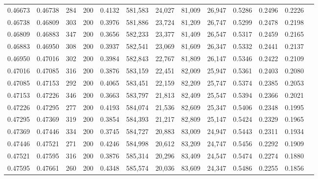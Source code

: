 \begin{tabular}{rrrrrrrrrrrrr}
0.46673 & 0.46738 &    284 & 200 &                                     0.4132 & 581,583 &  24,027 &  81,009 &  26,947 & 0.5286 & 0.2496 & 0.2226 \\
0.46738 & 0.46809 &    303 & 200 &                                     0.3976 & 581,886 &  23,724 &  81,209 &  26,747 & 0.5299 & 0.2478 & 0.2198 \\
0.46809 & 0.46883 &    347 & 200 &                                     0.3656 & 582,233 &  23,377 &  81,409 &  26,547 & 0.5317 & 0.2459 & 0.2165 \\
0.46883 & 0.46950 &    308 & 200 &                                     0.3937 & 582,541 &  23,069 &  81,609 &  26,347 & 0.5332 & 0.2441 & 0.2137 \\
0.46950 & 0.47016 &    302 & 200 &                                     0.3984 & 582,843 &  22,767 &  81,809 &  26,147 & 0.5346 & 0.2422 & 0.2109 \\
0.47016 & 0.47085 &    316 & 200 &                                     0.3876 & 583,159 &  22,451 &  82,009 &  25,947 & 0.5361 & 0.2403 & 0.2080 \\
0.47085 & 0.47153 &    292 & 200 &                                     0.4065 & 583,451 &  22,159 &  82,209 &  25,747 & 0.5374 & 0.2385 & 0.2053 \\
0.47153 & 0.47226 &    346 & 200 &                                     0.3663 & 583,797 &  21,813 &  82,409 &  25,547 & 0.5394 & 0.2366 & 0.2021 \\
0.47226 & 0.47295 &    277 & 200 &                                     0.4193 & 584,074 &  21,536 &  82,609 &  25,347 & 0.5406 & 0.2348 & 0.1995 \\
0.47295 & 0.47369 &    319 & 200 &                                     0.3854 & 584,393 &  21,217 &  82,809 &  25,147 & 0.5424 & 0.2329 & 0.1965 \\
0.47369 & 0.47446 &    334 & 200 &                                     0.3745 & 584,727 &  20,883 &  83,009 &  24,947 & 0.5443 & 0.2311 & 0.1934 \\
0.47446 & 0.47521 &    271 & 200 &                                     0.4246 & 584,998 &  20,612 &  83,209 &  24,747 & 0.5456 & 0.2292 & 0.1909 \\
0.47521 & 0.47595 &    316 & 200 &                                     0.3876 & 585,314 &  20,296 &  83,409 &  24,547 & 0.5474 & 0.2274 & 0.1880 \\
0.47595 & 0.47661 &    260 & 200 &                                     0.4348 & 585,574 &  20,036 &  83,609 &  24,347 & 0.5486 & 0.2255 & 0.1856 \\

\end{tabular}
